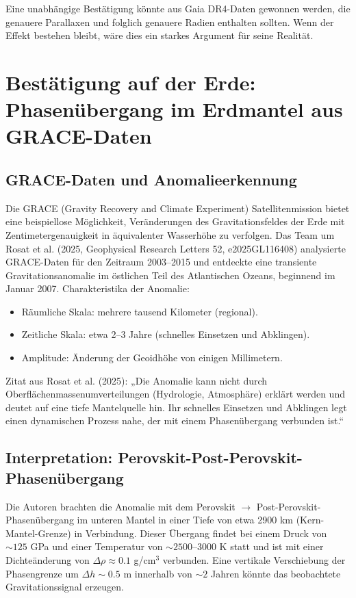 \documentclass[12pt]{article}
\theoremstyle{remark}
\begin{document}
	Eine unabhängige Bestätigung könnte aus Gaia DR4-Daten gewonnen werden, die genauere Parallaxen und folglich genauere Radien enthalten sollten. Wenn der Effekt bestehen bleibt, wäre dies ein starkes Argument für seine Realität.
	
	\section{Bestätigung auf der Erde: Phasenübergang im Erdmantel aus GRACE-Daten}
	\label{sec:grace}
	
	\subsection{GRACE-Daten und Anomalieerkennung}
	\label{subsec:grace-data}
	
	Die GRACE (Gravity Recovery and Climate Experiment) Satellitenmission bietet eine beispiellose Möglichkeit, Veränderungen des Gravitationsfeldes der Erde mit Zentimetergenauigkeit in äquivalenter Wasserhöhe zu verfolgen. Das Team um Rosat et al. (2025, Geophysical Research Letters 52, e2025GL116408) analysierte GRACE-Daten für den Zeitraum 2003–2015 und entdeckte eine transiente Gravitationsanomalie im östlichen Teil des Atlantischen Ozeans, beginnend im Januar 2007. Charakteristika der Anomalie:
	\begin{itemize}
		\item Räumliche Skala: mehrere tausend Kilometer (regional).
		\item Zeitliche Skala: etwa 2–3 Jahre (schnelles Einsetzen und Abklingen).
		\item Amplitude: Änderung der Geoidhöhe von einigen Millimetern.
	\end{itemize}
	Zitat aus Rosat et al. (2025): „Die Anomalie kann nicht durch Oberflächenmassenumverteilungen (Hydrologie, Atmosphäre) erklärt werden und deutet auf eine tiefe Mantelquelle hin. Ihr schnelles Einsetzen und Abklingen legt einen dynamischen Prozess nahe, der mit einem Phasenübergang verbunden ist.“
	
	\subsection{Interpretation: Perovskit-Post-Perovskit-Phasenübergang}
	\label{subsec:grace-interpretation}
	
	Die Autoren brachten die Anomalie mit dem Perovskit $\rightarrow$ Post-Perovskit-Phasenübergang im unteren Mantel in einer Tiefe von etwa 2900 km (Kern-Mantel-Grenze) in Verbindung. Dieser Übergang findet bei einem Druck von $\sim 125$ GPa und einer Temperatur von $\sim 2500$–$3000$ K statt und ist mit einer Dichteänderung von $\Delta\rho \approx 0.1$ g/cm$^3$ verbunden. Eine vertikale Verschiebung der Phasengrenze um $\Delta h \sim 0.5$ m innerhalb von $\sim 2$ Jahren könnte das beobachtete Gravitationssignal erzeugen.
	
\end{document}
